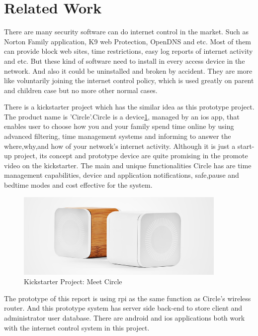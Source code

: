 \section{Related Work}
\par There are many security software can do internet control in the market. Such as Norton Family application\cite{Norton}, K9 web Protection\cite{K9}, OpenDNS\cite{OpenDNS} and etc. Most of them can provide block web sites, time restrictions, easy log reports of internet activity and etc. But these kind of software need to install in every access device in the network. And also it could be uninstalled and broken by accident. They are more like voluntarily joining the internet control policy, which is used greatly on parent and children case but no more other normal cases.
\par There is a kickstarter\cite{kickstarterCircle} project which has the similar idea as this prototype project. The product name is 'Circle'\cite{Circle}.Circle is a device\ref{fig:circle_project}, managed by an \gls{ios} app, that enables user to choose how you and your family spend time online by using advanced filtering, time management systems and informing to answer the where,why,and how of your network's internet activity. Although it is just a start-up project, its concept and prototype device are quite promising in the promote video on the kickstarter. The main and unique functionalities Circle has are time management capabilities, device and application notifications, safe,pause and bedtime modes and cost effective for the system. 
\begin{figure}
	\centering
    	\includegraphics[width=0.90\textwidth,natwidth=610,natheight=642]{figs/circleDevice.jpg}
  	\caption{Kickstarter Project: Meet Circle}
  	\label{fig:circle_project}
\end{figure}
\par The prototype of this report is using \gls{rpi} as the same function as Circle's wireless router. And this prototype system has server side back-end to store client and administrator user database. There are android and \gls{ios} applications both work with the internet control system in this project.
